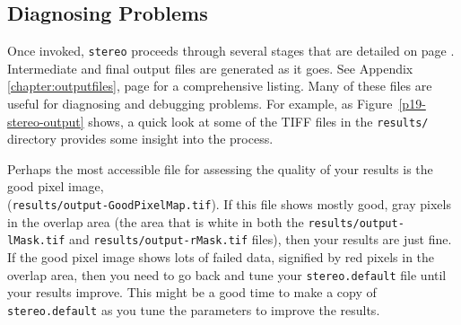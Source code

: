 \subsection{Diagnosing Problems}

Once invoked, \texttt{stereo} proceeds through several stages that are
detailed on page \pageref{entrypoints}.  Intermediate and final output
files are generated as it goes.  See Appendix
\ref{chapter:outputfiles}, page \pageref{chapter:outputfiles} for a
comprehensive listing.  Many of these files are useful for diagnosing and
debugging problems.  For example, as Figure~\ref{p19-stereo-output}
shows, a quick look at some of the TIFF files in the \texttt{results/}
directory provides some insight into the process.

Perhaps the most accessible file for assessing the quality of your
results is the good pixel image, \\
(\texttt{results/output-GoodPixelMap.tif}).  If this file shows mostly
good, gray pixels in the overlap area (the area that is white in both
the \texttt{results/output-lMask.tif} and
\texttt{results/output-rMask.tif} files), then your results are just
fine.  If the good pixel image shows lots of failed data, signified by
red pixels in the overlap area, then you need to go back and tune your
\texttt{stereo.default} file until your results improve.  This might be
a good time to make a copy of \texttt{stereo.default} as you tune the
parameters to improve the results.

